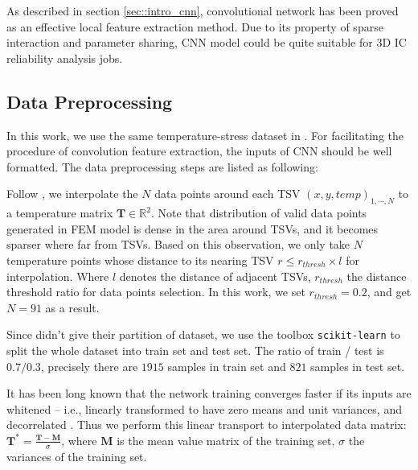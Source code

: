 As described in section \ref{sec::intro_cnn}, convolutional network has been proved as
an effective local feature extraction method. Due to its property of sparse interaction
and parameter sharing, CNN model could be quite suitable for 3D IC reliability analysis jobs.

\subsection{Data Preprocessing}
In this work, we use the same temperature-stress dataset in \cite{Zhang2016Fast}. 
For facilitating the procedure of convolution feature extraction, 
the inputs of CNN should be well formatted. 
The data preprocessing steps are listed as following:

\begin{description}[labelsep=0.5em]
    \item[Data Interpolation] Follow \cite{Zhang2016Fast}, we interpolate the $N$ data points 
    around each TSV $\left(x,y,temp\right)_{1,\cdots,N}$
    to a temperature matrix $\mathbf{T}\in\mathbb{R}^2$.
    Note that distribution of valid data points generated in FEM model is dense in
    the area around TSVs, and it becomes sparser where far from TSVs.
    Based on this observation, we only take $N$ temperature points whose distance to its nearing TSV 
    $r \le r_{thresh} \times l$ for interpolation. Where $l$ denotes the distance of adjacent TSVs,
    $r_{thresh}$ the distance threshold ratio for data points selection. \label{itm::interp}
    In this work, we set $r_{thresh}=0.2$, and get $N=91$ as a result.
    
    \item[Train-Val Splitting] Since \cite{Zhang2016Fast} didn't give their partition of dataset,
    we use the toolbox \texttt{scikit-learn} to split the whole dataset into train set and test set.
    The ratio of train / test is $0.7 / 0.3$, precisely there are $1915$ samples in train set and
    $821$ samples in test set.
    
    \item[Whitening] It has been long known that the network training converges faster 
    if its inputs are whitened – i.e., 
    linearly transformed to have zero means and unit variances, and decorrelated \cite{orr2003neural}.
    Thus we perform this linear transport to interpolated data matrix: 
    $\mathbf{T}^* = \frac{\mathbf{T} - \mathbf{M}}{\sigma}$, 
    where $\mathbf{M}$ is the mean value matrix of the training set, $\sigma$ the variances of the training set.
     
\end{description}

